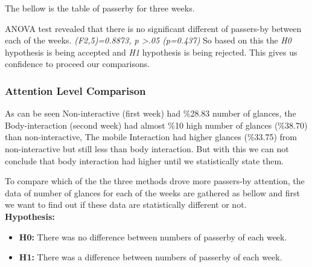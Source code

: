 The bellow is the table of passerby for three weeks.

\begin{table}[H]
\caption{Number of passerby in three weeks}
\label{tab:passerbyofthreeweeks}
\centering
{}
\end{table}

ANOVA test revealed that there is no significant different of passers-by between each of the weeks.
 \emph{(F2,5)=0.8873, p >.05 (p=0.437)}
 So based on this the \emph{H0} hypothesis is being accepted and \emph{H1} hypothesis is being rejected. This gives us confidence to proceed our comparisons.



\subsubsection {Attention Level Comparison}

As can be seen Non-interactive (first week) had \%28.83 number of glances, the Body-interaction (second week) had almost \%10 high number of glances (\%38.70) than non-interactive, The mobile Interaction had higher glances (\%33.75) from non-interactive but still less than body interaction. But with this we can not conclude that body interaction had higher until we statistically state them.

To compare which of the the three methods drove more passers-by attention, the data of number of glances for each of the weeks are gathered as bellow and first we want to find out if these data are statistically different or not.\\

\textbf{Hypothesis: }
\begin{itemize}
\item \textbf{H0:} There was no difference between numbers of passerby of each week.
\item \textbf{H1:} There was a difference between numbers of passerby of each week.
\end{itemize}




